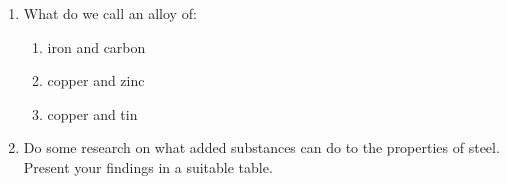 \begin{enumerate}
\item What do we call an alloy of:
\begin{enumerate}
\item iron and carbon
\item copper and zinc 
\item copper and tin
\end{enumerate}

\item Do some research on what added substances can do to the properties of steel. Present your findings in a suitable table.
 
\end{enumerate}







